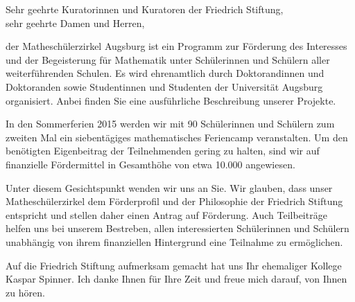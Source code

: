 \documentclass{zirkelbrief}
\begin{document}
\renewcommand{\anschrift}{%
      Friedrich Stiftung \\
      Schiffgraben 42 \\
      30175 Hannover \\}
\renewcommand{\datum}{\today}
\renewcommand{\betreff}{Matheschülerzirkel Augsburg}
\renewcommand{\absender}{%
      \textbf{Ingo Blechschmidt} \\
      \ \\
      Lehrstuhl für Algebra und Zahlentheorie \\
      Universitätsstr. 14 \\
      86159 Augsburg \\
      \ \\
      Telefon \> +49 (0) 821 598 -- 5601 \\
      Telefax \> +49 (0) 821 598 -- 2090 \\
      \textsf{blechschmidt@math.uni-augsburg.de} \\}

\makeletterhead

Sehr geehrte Kuratorinnen und Kuratoren der Friedrich Stiftung, \\
sehr geehrte Damen und Herren,

der Matheschülerzirkel Augsburg ist ein Programm zur Förderung
des Interesses und der Begeisterung für Mathematik unter Schülerinnen und
Schülern aller weiterführenden Schulen. Es wird ehrenamtlich durch Doktorandinnen und
Doktoranden sowie Studentinnen und Studenten der Universität Augsburg
organisiert. Anbei finden Sie eine ausführliche Beschreibung unserer Projekte.

In den Sommerferien 2015 werden wir mit 90 Schülerinnen und Schülern zum
zweiten Mal ein siebentägiges mathematisches Feriencamp veranstalten. Um den
benötigten Eigenbeitrag der Teilnehmenden gering zu halten, sind wir auf
finanzielle Fördermittel in Gesamthöhe von etwa 10.000 \texteuro{} angewiesen.

Unter diesem Gesichtspunkt wenden wir uns an Sie. Wir glauben, dass unser
Mathe\-schü\-ler\-zir\-kel dem Förderprofil und der Philosophie der Friedrich
Stiftung entspricht und stellen daher einen Antrag auf Förderung. Auch Teilbeiträge
helfen uns bei unserem Bestreben, allen interessierten Schülerinnen und
Schülern unabhängig von ihrem finanziellen Hintergrund eine Teilnahme zu
ermöglichen.

Auf die Friedrich Stiftung aufmerksam gemacht hat uns Ihr  
ehemaliger Kollege Kaspar Spinner. Ich danke Ihnen für Ihre Zeit und freue mich
darauf, von Ihnen zu hören.
\end{document}
